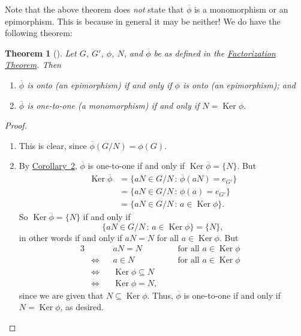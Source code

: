 \documentclass[10pt,openany,oneside]{book}
\theoremstyle{plain}
\newtheorem{theorem}{Theorem}[section]
\theoremstyle{definition}
\theoremstyle{definition}
\theoremstyle{definition}
\theoremstyle{definition}
\numberwithin{equation}{section}
\def\phibar{\overline{\phi}}
\DeclareMathOperator{\Ker}{Ker}
\newcommand{\amp}{&}
\begin{document}
Note that the above theorem does \emph{not} state that \(\phibar\) is a monomorphism or an epimorphism. This is because in general it may be neither! We do have the following theorem:%
\begin{theorem}[{}]\label{epimono}
Let \(G\), \(G'\), \(\phi\), \(N\), and \(\phibar\) be as defined in the  \hyperref[facthm]{Factorization Theorem}. Then \leavevmode%
\begin{enumerate}
\item\hypertarget{li-506}{}\(\phibar\) is onto (an epimorphism) if and only if \(\phi\) is onto (an epimorphism); and%
\item\hypertarget{li-507}{}\(\phibar\) is one-to-one (a monomorphism) if and only if \(N=\Ker
\phi\).%
\end{enumerate}
%
\end{theorem}
\begin{proof}\hypertarget{proof-50}{}
\leavevmode%
\begin{enumerate}
\item\hypertarget{li-508}{}This is clear, since \(\phibar(G/N)=\phi(G)\).%
\item\hypertarget{li-509}{}By \hyperref[kerone]{Corollary~2}, \(\phibar\) is one-to-one if and only if \(\Ker
\phibar=\{N\}\).  But%
\begin{align*}
\Ker \phibar\amp =\{aN\in G/N
\,:\, \phibar(aN)=e_{G'}\}\\
\amp =\{aN\in G/N \,:\,
\phi(a)=e_{G'}\}\\
\amp =\{aN\in G/N \,:\, a\in
\Ker\phi\}.
\end{align*}
So \(\Ker \phibar = \{N\}\) if and only if%
\begin{equation*}
\{aN\in G/N\,:\,a\in \Ker\phi\}=\{N\},
\end{equation*}
in other words if and only if \(aN=N\) for all \(a\in \Ker\phi\).  But%
\begin{align*}
{3}
\amp \amp \amp aN=N \amp \amp \ \ \text{ for all \(a\in \Ker\phi\) }\\
\amp \Leftrightarrow  \amp \amp  a\in N \amp \amp \ \ \text{ for all \(a\in \Ker\phi\) }\\
\amp \Leftrightarrow  \amp \amp  \Ker \phi\subseteq N\amp \amp\\
\amp \Leftrightarrow  \amp \amp  \Ker\phi=N,\amp \amp
\end{align*}
since we are given that \(N\subseteq \Ker \phi\). Thus, \(\phibar\) is one-to-one if and only if \(N=\Ker\phi\), as desired.%
\end{enumerate}
%
\end{proof}
\end{document}
